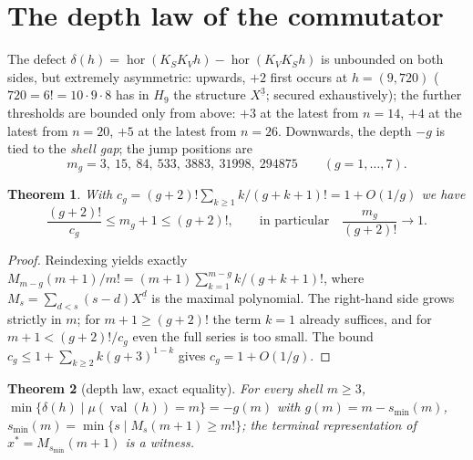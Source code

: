 \documentclass[11pt]{article}
\newtheorem{satz}{Theorem}[section]
\theoremstyle{definition}
\theoremstyle{remark}
\newcommand{\val}{\operatorname{val}}
\newcommand{\ff}[2]{#1^{\underline{#2}}}
\newcommand{\KV}{K_V}
\newcommand{\KS}{K_S}
\begin{document}
\section{The depth law of the commutator}

The defect
$\delta(h)=\operatorname{hor}(\KS\KV h)-\operatorname{hor}(\KV\KS h)$
is unbounded on both sides, but extremely asymmetric: upwards, $+2$
first occurs at $h=(9,720)$ ($720=6!=10\cdot9\cdot8$ has in
$H_9$ the structure $\ff X3$; secured exhaustively); the further
thresholds are bounded only from above: $+3$ at the latest from
$n=14$, $+4$ at the latest from $n=20$, $+5$ at the latest from
$n=26$. Downwards, the depth $-g$ is tied to the \emph{shell gap};
the jump positions are
\[
m_g=3,\ 15,\ 84,\ 533,\ 3883,\ 31998,\ 294875\qquad(g=1,\dots,7).
\]

\begin{satz}\label{satz:asymptotik}
With $c_g=(g{+}2)!\sum_{k\ge1}k/(g{+}k{+}1)!=1+O(1/g)$ we have
\[
\frac{(g+2)!}{c_g}\le m_g+1\le(g+2)!,
\qquad\text{in particular}\quad
\frac{m_g}{(g+2)!}\to1 .
\]
\end{satz}

\begin{proof}
Reindexing yields exactly
$M_{m-g}(m{+}1)/m!=(m{+}1)\sum_{k=1}^{m-g}k/(g{+}k{+}1)!$, where
$M_s=\sum_{d<s}(s{-}d)\ff Xd$ is the maximal polynomial. The
right-hand side grows strictly in $m$; for $m{+}1\ge(g{+}2)!$ the
term $k{=}1$ already suffices, and for $m{+}1<(g{+}2)!/c_g$ even
the full series is too small. The bound
$c_g\le1+\sum_{k\ge2}k(g{+}3)^{1-k}$
gives $c_g=1+O(1/g)$.
\end{proof}

\begin{satz}[depth law, exact equality]\label{satz:tiefengesetz}
For every shell $m\ge3$,
$\min\{\delta(h)\mid\mu(\val(h))=m\}=-g(m)$ with
$g(m)=m-s_{\min}(m)$,
$s_{\min}(m)=\min\{s\mid M_s(m{+}1)\ge m!\}$; the terminal
representation of $x^*=M_{s_{\min}}(m{+}1)$ is a witness.
\end{satz}
\end{document}
